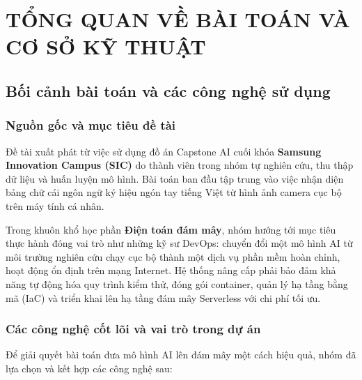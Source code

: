 
\chapter{TỔNG QUAN VỀ BÀI TOÁN VÀ CƠ SỞ KỸ THUẬT}
\label{chap:tong_quan}

\section{Bối cảnh bài toán và các công nghệ sử dụng}
\label{sec:boi_canh_cong_nghe}

\subsection{Nguồn gốc và mục tiêu đề tài}
\label{subsec:nguon_goc_de_tai}

Đề tài xuất phát từ việc sử dụng đồ án Capstone AI cuối khóa \textbf{Samsung Innovation Campus (SIC)} do thành viên trong nhóm tự nghiên cứu, thu thập dữ liệu và huấn luyện mô hình. Bài toán ban đầu tập trung vào việc nhận diện bảng chữ cái ngôn ngữ ký hiệu ngón tay tiếng Việt từ hình ảnh camera cục bộ trên máy tính cá nhân.

Trong khuôn khổ học phần \textbf{Điện toán đám mây}, nhóm hướng tới mục tiêu thực hành đóng vai trò như những kỹ sư DevOps: chuyển đổi một mô hình AI từ môi trường nghiên cứu chạy cục bộ thành một dịch vụ phần mềm hoàn chỉnh, hoạt động ổn định trên mạng Internet. Hệ thống nâng cấp phải bảo đảm khả năng tự động hóa quy trình kiểm thử, đóng gói container, quản lý hạ tầng bằng mã (IaC) và triển khai lên hạ tầng đám mây Serverless với chi phí tối ưu.

\subsection{Các công nghệ cốt lõi và vai trò trong dự án}
\label{subsec:vai_tro_cong_nghe}

Để giải quyết bài toán đưa mô hình AI lên đám mây một cách hiệu quả, nhóm đã lựa chọn và kết hợp các công nghệ sau:


